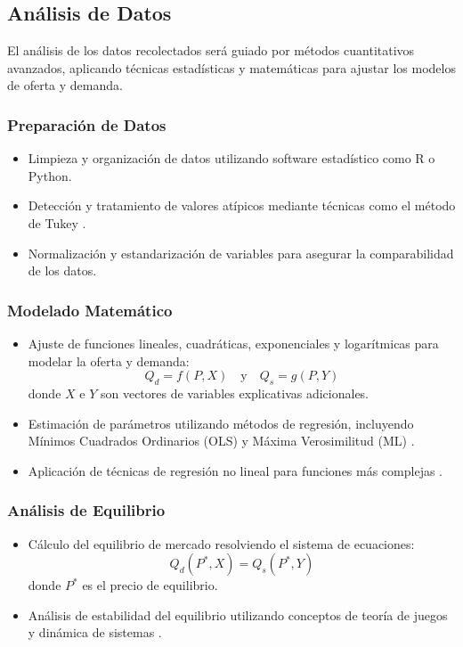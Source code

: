 \documentclass[12pt, a4paper]{article}
\begin{document}
\subsection{Análisis de Datos}

El análisis de los datos recolectados será guiado por métodos cuantitativos avanzados, aplicando técnicas estadísticas y matemáticas para ajustar los modelos de oferta y demanda.

\subsubsection{Preparación de Datos}
\begin{itemize}
    \item Limpieza y organización de datos utilizando software estadístico como R o Python.
    \item Detección y tratamiento de valores atípicos mediante técnicas como el método de Tukey \parencite{tukey1977}.
    \item Normalización y estandarización de variables para asegurar la comparabilidad de los datos.
\end{itemize}

\subsubsection{Modelado Matemático}
\begin{itemize}
    \item Ajuste de funciones lineales, cuadráticas, exponenciales y logarítmicas para modelar la oferta y demanda:
    \begin{equation}
        Q_d = f(P, X) \quad \text{y} \quad Q_s = g(P, Y)
    \end{equation}
    donde $X$ e $Y$ son vectores de variables explicativas adicionales.
    
    \item Estimación de parámetros utilizando métodos de regresión, incluyendo Mínimos Cuadrados Ordinarios (OLS) y Máxima Verosimilitud (ML) \parencite{wooldridge2010}.
    
    \item Aplicación de técnicas de regresión no lineal para funciones más complejas \parencite{greene2018}.
\end{itemize}

\subsubsection{Análisis de Equilibrio}
\begin{itemize}
    \item Cálculo del equilibrio de mercado resolviendo el sistema de ecuaciones:
    \begin{equation}
        Q_d(P^*, X) = Q_s(P^*, Y)
    \end{equation}
    donde $P^*$ es el precio de equilibrio.
    
    \item Análisis de estabilidad del equilibrio utilizando conceptos de teoría de juegos y dinámica de sistemas \parencite{mas2018}.
\end{itemize}
\end{document}
